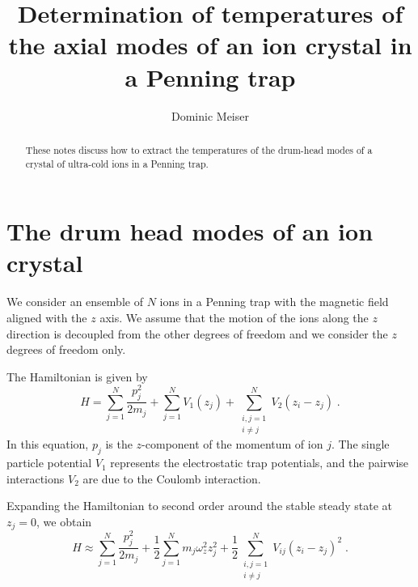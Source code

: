 \documentclass[aps, pra, preprint]{revtex4-1}
\begin{document}
\title{Determination of temperatures of the axial modes of an ion
  crystal in a Penning trap}
\author{Dominic Meiser}

\begin{abstract}
  These notes discuss how to extract the temperatures of the
  drum-head modes of a crystal of ultra-cold ions in a Penning
  trap.
\end{abstract}

\maketitle


\section{The drum head modes of an ion crystal}

We consider an ensemble of $N$ ions in a Penning trap with the
magnetic field aligned with the $z$ axis. We assume that the
motion of the ions along the $z$ direction is decoupled from the
other degrees of freedom and we consider the $z$ degrees of
freedom only.

The Hamiltonian is given by
\begin{equation}
  H=
    \sum_{j=1}^N\frac{p_j^2}{2m_j} +
    \sum_{j=1}^NV_1(z_j) +
    \sum_{\substack{i,j = 1\\i\neq j}}^{N}V_2(z_i - z_j)\;.
\end{equation}
In this equation, $p_j$ is the $z$-component of the momentum of
ion $j$. The single particle potential $V_1$ represents the
electrostatic trap potentials, and the pairwise interactions
$V_2$ are due to the Coulomb interaction. 

Expanding the Hamiltonian to second order around the stable
steady state at $z_j=0$, we obtain
\begin{equation}
  H\approx 
    \sum_{j=1}^N \frac{p_j^2}{2m_j} +
    \frac{1}{2}\sum_{j=1}^N m_j \omega_z^2 z_j^2+
    \frac{1}{2}\sum_{\substack{i,j = 1\\i\neq j}}^{N} V_{ij}(z_i-z_j)^2\;.
\end{equation}
\end{document}
